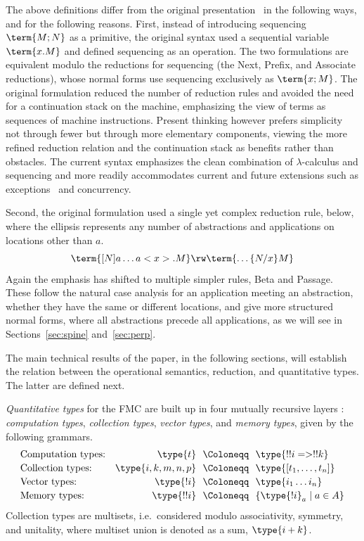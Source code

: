 \documentclass[a4paper,UKenglish,cleveref, autoref, thm-restate]{lipics-v2021}
\newcommand\defn\emph
\begin{document}
The above definitions differ from the original presentation~\cite{Heijltjes-2022} in the following ways, and for the following reasons. First, instead of introducing sequencing $\term{M;N}$ as a primitive, the original syntax used a sequential variable $\term{x.M}$ and defined sequencing as an operation. The two formulations are equivalent modulo the reductions for sequencing (the Next, Prefix, and Associate reductions), whose normal forms use sequencing exclusively as $\term{x;M}$. The original formulation reduced the number of reduction rules and avoided the need for a continuation stack on the machine, emphasizing the view of terms as sequences of machine instructions. Present thinking however prefers simplicity not through fewer but through more elementary components, viewing the more refined reduction relation and the continuation stack as benefits rather than obstacles. The current syntax emphasizes the clean combination of $\lambda$-calculus and sequencing and more readily accommodates current and future extensions such as exceptions~\cite{Heijltjes-2025} and concurrency.

Second, the original formulation used a single yet complex reduction rule, below, where the ellipsis represents any number of abstractions and applications on locations other than $a$. 
\[
	\term{[N]a\dots a<x>.M}\rw\term{\dots\{N/x\}M}
\]
Again the emphasis has shifted to multiple simpler rules, Beta and Passage. These follow the natural case analysis for an application meeting an abstraction, whether they have the same or different locations, and give more structured normal forms, where all abstractions precede all applications, as we will see in Sections~\ref{sec:spine} and~\ref{sec:perp}.

The main technical results of the paper, in the following sections, will establish the relation between the operational semantics, reduction, and quantitative types. The latter are defined next.

\begin{definition}
\defn{Quantitative types} for the FMC are built up in four mutually recursive layers : \defn{computation types}, \defn{collection types}, \defn{vector types}, and \emph{memory types}, given by the following grammars.
\[
\begin{array}{lr@{~~}c@{~~}l}
	    \text{Computation types:}	& \type{t}         & \Coloneqq & \type{!!i => !!k}
\\[2pt]	\text{Collection types:}	& \type{i,k,m,n,p} & \Coloneqq & \type{[t_1,\dots,t_n]}
\\[2pt]	\text{Vector types:}		& \type{!i}        & \Coloneqq & \type{i_1\dots i_n}
\\[2pt]	\text{Memory types:}		& \type{!!i}       & \Coloneqq & \{\type{!i}_a\mid a\in A\}	
\end{array}
\]
Collection types are multisets, i.e.\ considered modulo associativity, symmetry, and unitality, where multiset union is denoted as a sum, $\type{i+k}$.
\end{definition}
\end{document}
